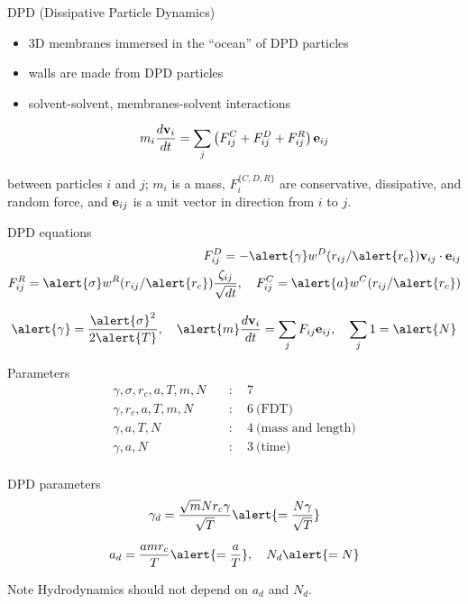\begin{frame}{DPD (Dissipative Particle Dynamics)}
\begin{itemize}
  \item 3D membranes immersed in the ``ocean'' of DPD particles
  \item walls are made from DPD particles
  \item solvent-solvent, membranes-solvent interactions
\end{itemize}

\[
  m_i \frac{d \mathbf{v}_i}{dt} = \sum_{j}
  \left(
    F_{ij}^{C} + F_{ij}^{D} + F_{ij}^{R}
  \right) \mathbf{e}_{ij}{}
\]

between particles $i$ and $j$; $m_i$ is a mass, $F_{i}^{\{C,D,R\}}$
are conservative, dissipative, and random force, and $\mathbf{e}_{ij}{}$ is a unit
vector in direction from $i$ to $j$.
\end{frame}

\begin{frame}{DPD equations}
\begin{align*}
  \label{eq:FD}
  F_{ij}^D = - \alert{\gamma} w^{D}(r_{ij}/\alert{r_{c}}) \mathbf{v}_{ij} \cdot \mathbf{e}_{ij} \\
  F_{ij}^R = \alert{\sigma} w^{R}(r_{ij}/\alert{r_{c}}) \frac{\zeta_{ij}}{\sqrt{dt}}, \quad
  F_{ij}^C = \alert{a} w^C(r_{ij}/\alert{r_{c}})
\end{align*}

\[
  \alert{\gamma} =\frac{\alert{\sigma}^2}{2\alert{T}},
  \quad \alert{m} \frac{d \mathbf{v}_{i}}{dt} = \sum_j F_{ij} \mathbf{e}_{ij},
  \quad
  \sum_j 1 = \alert{N}
\]

\begin{exampleblock}{Parameters}
\begin{align*}
    \gamma,           \sigma ,     r_c, a, T,    m,    N \quad &: \quad 7 \\
    \gamma,                        r_c, a ,T,    m,    N \quad &: \quad 6\ \text{(FDT)} \\
    \gamma,                             a, T,    N       \quad &: \quad 4\ \text{(mass and length)} \\
    \gamma,                             a,       N       \quad &: \quad 3\ \text{(time)} \\
\end{align*}
\end{exampleblock}
\end{frame}

\begin{frame}{DPD parameters}
\[
  \gamma_d = \frac{ \sqrt{m} N r_c \gamma}{ \sqrt{T} }
  \alert{ = \frac{ N \gamma}{ \sqrt{T} } }
\]

\[
   a_d     = \frac{a m r_c}{ T } \alert{ = \frac{a}{T} }, \quad
   N_d                          \alert{ = N}
\]

\begin{exampleblock}{Note}
Hydrodynamics should not depend on  $a_d$ and $N_d$.
\end{exampleblock}
\end{frame}

